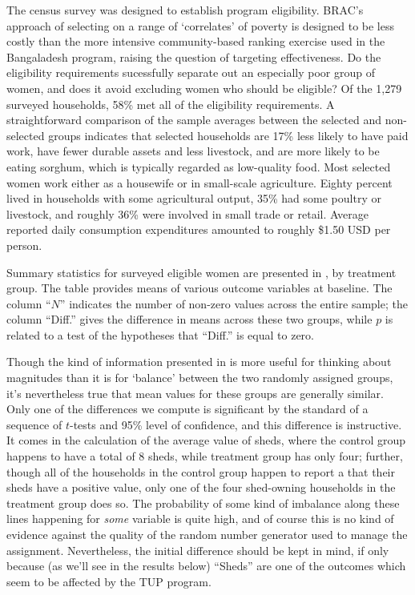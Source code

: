 \documentclass[12pt,letterpaper]{article}
\begin{document}
The census survey was designed to establish program eligibility.
BRAC's approach of selecting on a range of `correlates' of poverty
is designed to be less costly than the more intensive
community-based ranking exercise used in the Bangaladesh program,
raising the question of targeting effectiveness.  Do the eligibility
requirements sucessfully separate out an especially poor group of
women, and does it avoid excluding women who should be eligible? Of
the 1,279 surveyed households, 58\% met all of the eligibility
requirements.  A straightforward comparison of the sample averages
between the selected and non-selected groups indicates that selected
households are 17\% less likely to have paid work, have fewer
durable assets and less livestock, and are more likely to be eating
sorghum, which is typically regarded as low-quality food.  Most
selected women work either as a housewife or in small-scale
agriculture. Eighty percent lived in households with some
agricultural output, 35\% had some poultry or livestock, and roughly
36\% were involved in small trade or retail.  Average reported daily
consumption expenditures amounted to roughly \$1.50 USD per person.

Summary statistics for surveyed eligible women are presented in
, by treatment group.  The table provides
means of various outcome variables at baseline.  The column ``\(N\)''
indicates the number of non-zero values across the entire sample;
the column ``Diff.'' gives the difference in means across these two
groups, while \(p\) is related to a test of the hypotheses that
``Diff.'' is equal to zero.

Though the kind of information presented in  is
more useful for thinking about magnitudes than it is for `balance'
between the two randomly assigned groups, it's nevertheless true
that mean values for these groups are generally similar.  Only one
of the differences we compute is significant by the standard of a
sequence of \(t\)-tests and 95\% level of confidence, and this
difference is instructive.  It comes in the calculation of the
average value of sheds, where the control group happens to have a
total of 8 sheds, while treatment group has only four; further,
though all of the households in the control group happen to report a
that their sheds have a positive value, only one of the four
shed-owning households in the treatment group does so.  The
probability of some kind of imbalance along these lines happening
for \emph{some} variable is quite high, and of course this is no kind of
evidence against the quality of the random number generator used to
manage the assignment.  Nevertheless, the initial difference should
be kept in mind, if only because (as we'll see in the results below)
``Sheds'' are one of the outcomes which seem to be affected by the TUP
program.
\end{document}
